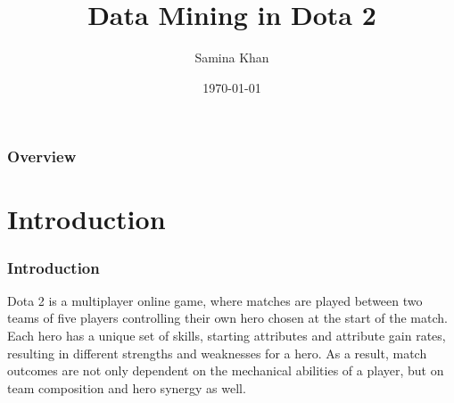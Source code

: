 \documentclass{beamer}
\title[CSE469]{Data Mining in Dota 2} %
\author{Samina Khan} %
\institute[UB] %
{
University at Buffalo \\ %
\medskip
\textit{saminakh@buffalo.edu} %
}
\date{\today} %
\begin{document}
\begin{frame}
\titlepage %
\end{frame}

\begin{frame}
\frametitle{Overview} %
\tableofcontents %
\end{frame}



\section{Introduction}

\begin{frame}
\frametitle{Introduction}
Dota 2 is a multiplayer online game, where matches are played between two teams of five players controlling their own hero chosen at the start of the match. Each hero has a unique set of skills, starting attributes and attribute gain rates, resulting in different strengths and weaknesses for a hero. As a result, match outcomes are not only dependent on the mechanical abilities of a player, but on team composition and hero synergy as well. 
\end{frame}

\end{document}
